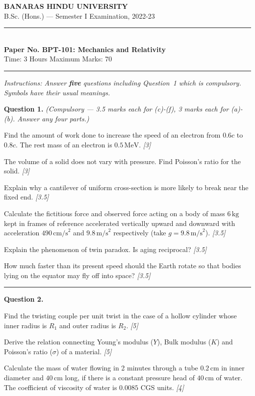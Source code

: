 \documentclass[11pt,a4paper]{article}
\newcommand{\pts}[1]{\hfill   \textit{[#1]}}
\begin{document}
\begin{center}
  {\large\bfseries BANARAS HINDU UNIVERSITY}\\[2pt]
  {\normalsize B.Sc. (Hons.) --- Semester I Examination, 2022-23}\\[6pt]
  \rule{0.8\linewidth}{0.5pt}\\[6pt]
  {\large\bfseries Paper No. BPT-101: Mechanics and Relativity}\\[4pt]
  {\normalsize Time: 3 Hours \hfill Maximum Marks: 70}
\end{center}
\rule{\linewidth}{0.4pt}
\smallskip



\noindent   \textit{Instructions: Answer   \textbf{five} questions including Question~1 which is compulsory. Symbols have their usual meanings.}
\bigskip




\noindent   \textbf{Question 1.}   \textit{(Compulsory --- 3.5 marks each for (c)-(f), 3 marks each for (a)-(b). Answer any four parts.)}

\begin{parts}
  \item Find the amount of work done to increase the speed of an electron from $0.6c$ to $0.8c$. The rest mass of an electron is $0.5\, \text{MeV}$. \pts{3}
  \item The volume of a solid does not vary with pressure. Find Poisson's ratio for the solid. \pts{3}
  \item Explain why a cantilever of uniform cross-section is more likely to break near the fixed end. \pts{3.5}
  \item Calculate the fictitious force and observed force acting on a body of mass $6\, \text{kg}$ kept in frames of reference accelerated vertically upward and downward with acceleration $490\, \text{cm/s}^2$ and $9.8\, \text{m/s}^2$ respectively (take $g = 9.8\, \text{m/s}^2$). \pts{3.5}
  \item Explain the phenomenon of twin paradox. Is aging reciprocal? \pts{3.5}
  \item How much faster than its present speed should the Earth rotate so that bodies lying on the equator may fly off into space? \pts{3.5}
\end{parts}

\medskip\rule{\linewidth}{0.2pt}

\medskip


\noindent   \textbf{Question 2.}

\begin{parts}
  \item Find the twisting couple per unit twist in the case of a hollow cylinder whose inner radius is $R_1$ and outer radius is $R_2$. \pts{5}
  \item Derive the relation connecting Young's modulus ($Y$), Bulk modulus ($K$) and Poisson's ratio ($\sigma$) of a material. \pts{5}
  \item Calculate the mass of water flowing in 2 minutes through a tube $0.2\, \text{cm}$ in inner diameter and $40\, \text{cm}$ long, if there is a constant pressure head of $40\, \text{cm}$ of water. The coefficient of viscosity of water is $0.0085$ CGS units. \pts{4}
\end{parts}
\end{document}
